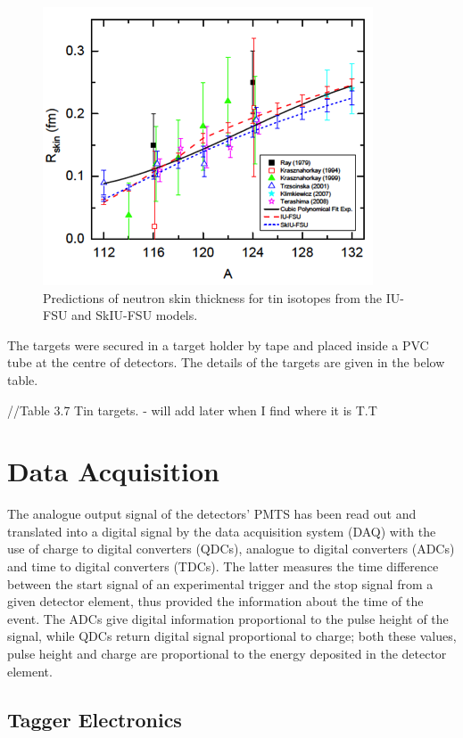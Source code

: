 \begin{figure}[H]
\begin{center}
\includegraphics[scale=0.8]{pictures/png/tiniso.png}
\caption{Predictions of neutron skin thickness for tin isotopes from the IU-FSU and SkIU-FSU models.}
\label{isochain}
\end{center}
\end{figure} 

\indent The targets were secured in a target holder by tape and placed inside a PVC tube at the centre of detectors. The details of the targets are given in the below table.

//Table 3.7 Tin targets. - will add later when I find where it is T.T 

\section{Data Acquisition}

\indent The analogue output signal of the detectors' PMTS has been read out and translated into a digital signal by the data acquisition system (DAQ) with the use of charge to digital converters (QDCs), analogue to digital converters (ADCs) and time to digital converters (TDCs). The latter measures the time difference between the start signal of an experimental trigger and the stop signal from a given detector element, thus provided the information about the time of the event. The ADCs give digital information proportional to the pulse height of the signal, while QDCs return digital signal proportional to charge; both these values, pulse height and charge are proportional to the energy deposited in the detector element.

\subsection{Tagger Electronics}

